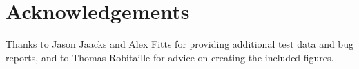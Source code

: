 \section*{Acknowledgements}
Thanks to Jason Jaacks and Alex Fitts for providing additional test data and bug reports, and to Thomas Robitaille for advice on creating the included figures.
